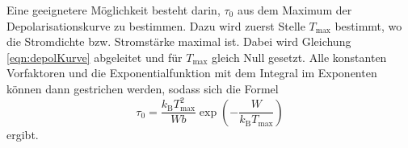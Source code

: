 Eine geeignetere Möglichkeit besteht darin, $\tau_0$ aus dem Maximum der Depolarisationskurve zu bestimmen. Dazu wird zuerst Stelle $T_{\text{max}}$  bestimmt, wo die Stromdichte bzw. Stromstärke maximal ist. Dabei wird Gleichung \eqref{eqn:depolKurve} abgeleitet und für $T_{\text{max}}$ gleich Null gesetzt.
Alle konstanten Vorfaktoren und die Exponentialfunktion mit dem Integral im Exponenten können dann gestrichen werden, sodass sich die Formel
\begin{equation}
  \tau_0 = \frac{k_\text{B}T_{\text{max}}^2}{Wb}\exp\left(-\frac{W}{k_\text{B}T_\text{max}}\right)
  \label{eqn:tau_0}
\end{equation}
ergibt.
